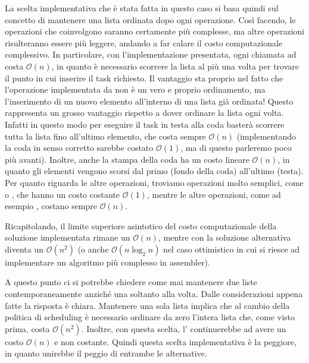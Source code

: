         La scelta implementativa che è stata fatta in questo caso si basa quindi sul concetto di mantenere una lista ordinata dopo ogni operazione. Così facendo, le operazioni che coinvolgono  saranno certamente più complesse, ma altre operazioni risulteranno essere più leggere, andando a far calare il costo computazionale complessivo. In particolare, con l'implementazione presentata, ogni chiamata ad  costa $\mathcal{O}(n)$, in quanto è necessario scorrere la lista al più una volta per trovare il punto in cui inserire il task richiesto. Il vantaggio sta proprio nel fatto che l'operazione implementata da  non è un vero e proprio ordinamento, ma l'inserimento di un nuovo elemento all'interno di una lista già ordinata! Questo rappresenta un grosso vantaggio rispetto a dover ordinare la lista ogni volta. Infatti in questo modo per eseguire il task in testa alla coda basterà scorrere tutta la lista fino all'ultimo elemento, che costa sempre $\mathcal{O}(n)$ (implementando la coda in senso corretto sarebbe costato $\mathcal{O}(1)$, ma di questo parleremo poco più avanti). Inoltre, anche la stampa della coda ha un costo lineare $\mathcal{O}(n)$, in quanto gli elementi vengono scorsi dal primo (fondo della coda) all'ultimo (testa). Per quanto riguarda le altre operazioni, troviamo operazioni molto semplici, come  o , che hanno un costo costante $\mathcal{O}(1)$, mentre le altre operazioni, come ad esempio , costano sempre $\mathcal{O}(n)$.
        
        Ricapitolando, il limite superiore asintotico del costo computazionale della soluzione implementata rimane un $\mathcal{O}(n)$, mentre con la soluzione alternativa diventa un $\mathcal{O}(n^2)$ (o anche $\mathcal{O}(n\log_2 n)$ nel caso ottimistico in cui si riesce ad implementare un algoritmo più complesso in assembler).
        
        A questo punto ci si potrebbe chiedere come mai mantenere due liste contemporaneamente anziché una soltanto alla volta. Dalle considerazioni appena fatte la risposta è chiara. Mantenere una sola lista implica che al cambio della politica di scheduling è necessario ordinare da zero l'intera lista che, come visto prima, costa $\mathcal{O}(n^2)$. Inoltre, con questa scelta, l' continuerebbe ad avere un costo $\mathcal{O}(n)$ e non costante. Quindi questa scelta implementativa è la peggiore, in quanto unirebbe il peggio di entrambe le alternative.
        

